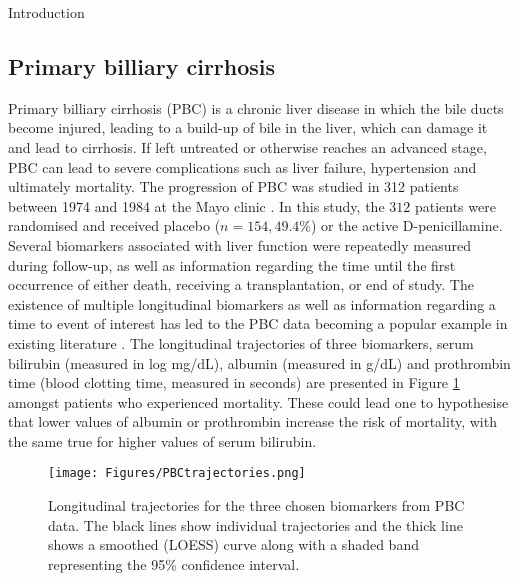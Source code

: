 \begin{chapter}{\label{cha:intro}Introduction}
  \subsection{\label{sec:motivation-pbc}Primary billiary cirrhosis}
   Primary billiary cirrhosis (PBC) is a chronic liver disease in which the bile ducts become injured, leading to a build-up of bile in the liver, which can damage it and lead to cirrhosis. If left untreated or otherwise reaches an advanced stage, PBC can lead to severe complications such as liver failure, hypertension and ultimately mortality. The progression of PBC was studied in 312 patients between 1974 and 1984 at the Mayo clinic \citep{PBCarticle}. In this study, the $312$ patients were randomised and received placebo ($n=154, 49.4\%$) or the active D-penicillamine. Several biomarkers associated with liver function were repeatedly measured during follow-up, as well as information regarding the time until the first occurrence of either death, receiving a transplantation, or end of study. The existence of multiple longitudinal biomarkers as well as information regarding a time to event of interest has led to the PBC data becoming a popular example in existing literature \citep{Hickey2018, PBCapp1, PBCapp2, PBCapp3}. The longitudinal trajectories of three biomarkers, serum bilirubin (measured in log mg/dL), albumin (measured in g/dL) and prothrombin time (blood clotting time, measured in seconds) are presented in Figure \ref{fig:PBCtrajectories} amongst patients who experienced mortality. These could lead one to hypothesise that lower values of albumin or prothrombin increase the risk of mortality, with the same true for higher values of serum bilirubin.
  
  \begin{figure}[h]
      \centering
      \texttt{[image: Figures/PBCtrajectories.png]}
      \caption{Longitudinal trajectories for the three chosen biomarkers from PBC data. The black lines show individual trajectories and the thick line shows a smoothed (LOESS) curve along with a shaded band representing the 95\% confidence interval.}
      \label{fig:PBCtrajectories}
  \end{figure}
  

\end{chapter}
